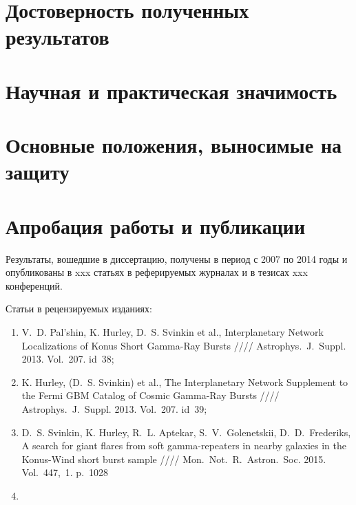 \section{Достоверность полученных результатов}



\section{Научная и практическая значимость}



\section{Основные положения, выносимые на защиту}




\section{Апробация работы и публикации}
Результаты, вошедшие в диссертацию, получены в период с 2007 по 2014
годы и опубликованы в xxx статьях в реферируемых журналах и в тезисах xxx конференций. 

Статьи в рецензируемых изданиях:
\begin{enumerate}
\item V.~D. Pal'shin, K. Hurley, D.~S. Svinkin et al., Interplanetary Network Localizations of
Konus Short Gamma-Ray Bursts //// Astrophys.~J.~Suppl. 2013. Vol.~207. id~38;
\item K. Hurley, (D.~S. Svinkin) et al., The Interplanetary Network Supplement to 
the Fermi GBM Catalog of Cosmic Gamma-Ray Bursts //// Astrophys.~J.~Suppl. 2013. Vol.~207. id~39;
\item D.~S. Svinkin, K. Hurley, R.~L. Aptekar, S.~V.~Golenetskii, D.~D.~Frederiks, 
A search for giant flares from soft gamma-repeaters in nearby galaxies in the 
Konus-Wind short burst sample //// Mon.~Not.~R.~Astron.~Soc. 2015. Vol.~447,~1. p.~1028
\item 
\end{enumerate}

